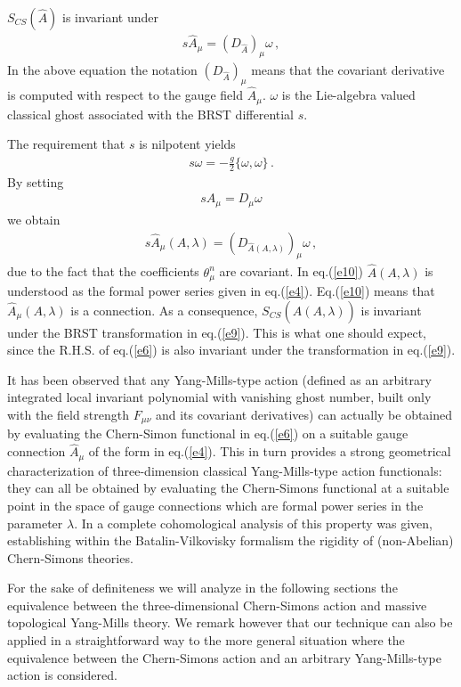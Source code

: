 \documentclass[a4paper,11pt]{article}
\begin{document}
$S_{CS}(\hat A)$ is invariant under
%
\begin{eqnarray}
s \hat A_\mu = (D_{\hat A})_\mu \omega \, , 
\label{e8}
\end{eqnarray}
%
In the above equation the notation $(D_{\hat A})_\mu$ means
that the covariant derivative is computed with respect to the
gauge field $\hat A_\mu$. 
$\omega$ is the Lie-algebra valued classical ghost associated with
the BRST differential $s$.

The requirement that $s$ is nilpotent yields
%
\begin{eqnarray}
s \omega = -\frac{g}{2} \{ \omega,\omega \} \, .
\label{e9_1}
\end{eqnarray}
%
By setting
%
\begin{eqnarray}
s A_\mu = D_\mu \omega 
\label{e9}
\end{eqnarray}
%
we obtain
%
\begin{eqnarray}
s \hat A_\mu (A,\lambda) = (D_{\hat A(A,\lambda)})_\mu \omega \, ,
\label{e10}
\end{eqnarray}
%
due to the fact that the coefficients $\theta^n_\mu$ are covariant.
In eq.(\ref{e10}) $\hat A(A,\lambda)$ is understood as the formal power series
given in eq.(\ref{e4}).
Eq.(\ref{e10}) means that $\hat A_\mu(A,\lambda)$ is a connection.
As a consequence, $S_{CS}(\hat A(A,\lambda))$ is invariant under 
the BRST transformation in eq.(\ref{e9}).
This is what one should expect, since
the R.H.S. of eq.(\ref{e6}) is also
invariant under the transformation in eq.(\ref{e9}).

It has been observed \cite{sorella2,Barnich:vg} that any Yang-Mills-type
action (defined as an arbitrary integrated local invariant 
polynomial with vanishing ghost number, built only with the field
strength $F_{\mu\nu}$ and its covariant derivatives) can actually be obtained
by evaluating the Chern-Simon functional in eq.(\ref{e6})  on a suitable
gauge connection $\hat A_\mu$ of the form in eq.(\ref{e4}).
This in turn provides a strong geometrical characterization
\cite{sorella2} of
three-dimension classical Yang-Mills-type action functionals: they 
can all be obtained
by evaluating the Chern-Simons functional at a suitable point
in the space of gauge connections which are formal power series
in the parameter $\lambda$.
In \cite{Barnich:vg} a complete cohomological analysis of this
property was given, establishing within the Batalin-Vilkovisky
formalism the rigidity of (non-Abelian) Chern-Simons theories.

For the sake of definiteness we will analyze in the following
sections the equivalence between the three-dimensional Chern-Simons action
and massive topological Yang-Mills theory. We remark however that our technique
can also be applied in a straightforward way to the more general
situation where the equivalence between the Chern-Simons action and
an arbitrary Yang-Mills-type action is considered.
\end{document}
